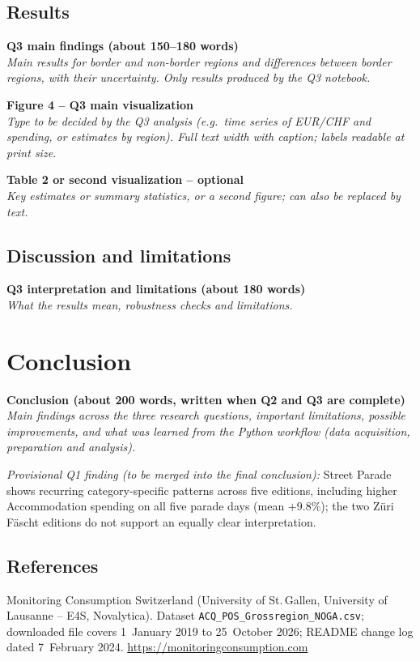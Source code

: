 \documentclass[10pt]{article}
\makeatletter
\newcommand{\placeholderbox}[3]{%
  \begin{tcolorbox}[colback=phbg,colframe=muted,boxrule=0.5pt,sharp corners,
    height=#1,halign=center,valign=center,left=4mm,right=4mm,top=1mm,bottom=1mm]
    {\bfseries\color{navy}#2}\\[3pt]
    {\small\color{muted}\itshape #3}
  \end{tcolorbox}}
\let\plainsection\section
\renewcommand{\section}{\Needspace*{6\baselineskip}\plainsection}
\renewcommand{\refname}{References}
\renewenvironment{thebibliography}[1]
  {\subsection*{\refname}\footnotesize
   \list{\@biblabel{\@arabic\c@enumiv}}%
        {\settowidth\labelwidth{\@biblabel{#1}}\leftmargin\labelwidth\advance\leftmargin\labelsep
         \itemsep 1pt\parsep 0pt\usecounter{enumiv}\let\p@enumiv\@empty\renewcommand\theenumiv{\@arabic\c@enumiv}}%
   \sloppy}
  {\endlist}
\makeatother
\begin{document}
\subsection{Results}
\placeholderbox{4.2cm}{Q3 main findings (about 150--180 words)}{Main results for border and non-border regions and differences between border regions, with their uncertainty.
Only results produced by the Q3 notebook.}
\placeholderbox{11.5cm}{Figure 4 -- Q3 main visualization}{Type to be decided by the Q3 analysis (e.g.\ time series of EUR/CHF and spending, or estimates by region).
Full text width with caption; labels readable at print size.}
\placeholderbox{5.0cm}{Table 2 or second visualization -- optional}{Key estimates or summary statistics, or a second figure; can also be replaced by text.}

\subsection{Discussion and limitations}
\placeholderbox{6.0cm}{Q3 interpretation and limitations (about 180 words)}{What the results mean, robustness checks and limitations.}

\section{Conclusion}
\placeholderbox{4.6cm}{Conclusion (about 200 words, written when Q2 and Q3 are complete)}{Main findings across the three research questions, important limitations, possible improvements,
and what was learned from the Python workflow (data acquisition, preparation and analysis).}

\textit{Provisional Q1 finding (to be merged into the final conclusion):} Street Parade shows recurring category-specific patterns across five editions, including higher Accommodation spending on all five parade days (mean $+9.8\%$); the two Züri Fäscht editions do not support an equally clear interpretation.

\begin{thebibliography}{9}
 \raggedright Monitoring Consumption Switzerland (University of St.\,Gallen, University of Lausanne -- E4S, Novalytica). Dataset \texttt{ACQ\_POS\_Grossregion\_NOGA.csv}; downloaded file covers 1~January 2019 to 25~October 2026; README change log dated 7~February 2024. \url{https://monitoringconsumption.com}
\end{thebibliography}
\end{document}
